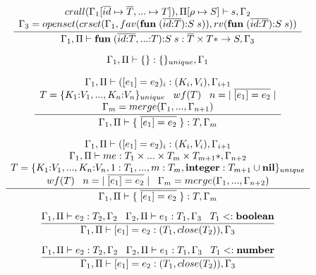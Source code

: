 \[
\dfrac{\begin{array}{c}
       crall(\Gamma_{1}[\overline{id} \mapsto \overline{T}, {...} \mapsto T]), \Pi[\rho \mapsto S] \vdash s, \Gamma_{2}\\
       \Gamma_{3} = openset(crset(\Gamma_{1}, fav(\mathbf{fun} \; (\overline{id{:}T}){:}S \; s)),rv(\mathbf{fun} \; (\overline{id{:}T}){:}S \; s))
       \end{array}}
      {\Gamma_{1}, \Pi \vdash \mathbf{fun} \; (\overline{id{:}T},{...}{:}T){:}S \; s:\overline{T} \times T{*} \rightarrow S, \Gamma_{3}}
\]

\[
\Gamma_{1}, \Pi \vdash \{\}:\{\}_{unique}, \Gamma_{1}
\]

\[
\dfrac{\begin{array}{c}
       \Gamma_{1}, \Pi \vdash ([e_{1}] = e_{2})_{i}:(K_{i},V_{i}), \Gamma_{i+1} \\
       T = \{K_{1}{:}V_{1}, ..., K_{n}{:}V_{n}\}_{unique} \;\;\;
       wf(T) \;\;\;
       n = |\;\overline{[e_{1}] = e_{2}}\;| \\
       \Gamma_{m} = merge(\Gamma_{1}, ..., \Gamma_{n+1})
       \end{array}}
      {\Gamma_{1}, \Pi \vdash \{\;\overline{[e_{1}] = e_{2}}\;\}:T, \Gamma_{m}}
\]

\[
\dfrac{\begin{array}{c}
       \Gamma_{1}, \Pi \vdash ([e_{1}] = e_{2})_{i}:(K_{i},V_{i}), \Gamma_{i+1} \\
       \Gamma_{1}, \Pi \vdash me : T_{1} \times ... \times T_{m} \times T_{m+1}{*}, \Gamma_{n+2}\\
       T = \{K_{1}{:}V_{1}, ..., K_{n}{:}V_{n}, 1:T_{1}, ..., m:T_{m}, \mathbf{integer}:T_{m+1} \cup \mathbf{nil}\}_{unique}\\
       wf(T) \;\;\;
       n = |\;\overline{[e_{1}] = e_{2}}\;| \;\;\;
       \Gamma_{m} = merge(\Gamma_{1}, ..., \Gamma_{n+2})
       \end{array}}
      {\Gamma_{1}, \Pi \vdash \{\;\overline{[e_{1}] = e_{2}}\;\}:T, \Gamma_{m}}
\]

\[
\dfrac{\Gamma_{1}, \Pi \vdash e_{2}:T_{2}, \Gamma_{2} \;\;\;
       \Gamma_{2}, \Pi \vdash e_{1}:T_{1}, \Gamma_{3} \;\;\;
       T_{1} <: \mathbf{boolean}}
      {\Gamma_{1}, \Pi \vdash [e_{1}] = e_{2}: (T_{1},close(T_{2})), \Gamma_{3}}
\]

\[
\dfrac{\Gamma_{1}, \Pi \vdash e_{2}:T_{2}, \Gamma_{2} \;\;\;
       \Gamma_{2}, \Pi \vdash e_{1}:T_{1}, \Gamma_{3} \;\;\;
       T_{1} <: \mathbf{number}}
      {\Gamma_{1}, \Pi \vdash [e_{1}] = e_{2}: (T_{1},close(T_{2})), \Gamma_{3}}
\]


